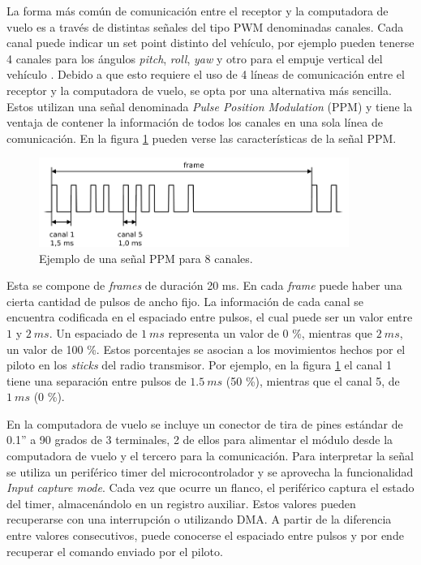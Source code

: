 La forma más común de comunicación entre el receptor y la computadora de vuelo es 
a través de distintas señales del tipo PWM denominadas canales. Cada canal puede indicar un set point distinto del vehículo, por ejemplo pueden tenerse 4 canales para los ángulos \textit{pitch}, \textit{roll}, \textit{yaw} y otro para el empuje vertical del vehículo \cite{garberoglio2019diseno}. Debido a que esto requiere el uso de 4 líneas de comunicación entre el receptor y la computadora de vuelo, se opta por una alternativa más sencilla. %
Estos utilizan una señal denominada \textit{Pulse Position Modulation} (PPM) y tiene la ventaja de contener la información de todos los canales en una sola línea de comunicación. En la figura \ref{fig:senial_ppm} pueden verse las características de la señal PPM.

\begin{figure}[htb]
    \centering
    \includegraphics[width=0.9\textwidth]{img/senial_ppm_mia.png}
    \caption{Ejemplo de una señal PPM para 8 canales.}
    \label{fig:senial_ppm}
\end{figure}

Esta se compone de \textit{frames} de duración 20 ms. En cada \textit{frame} puede haber una cierta cantidad de pulsos de ancho fijo. La información de cada canal se encuentra codificada en el espaciado entre pulsos, el cual puede ser un valor entre $1$ y $2 \ ms$. Un espaciado de $1 \ ms$ representa un valor de 0 \%, mientras que $2 \ ms$, un valor de 100 \%. Estos porcentajes se asocian a los movimientos hechos por el piloto en los \textit{sticks} del radio transmisor. Por ejemplo, en la figura \ref{fig:senial_ppm} el canal 1 tiene una separación entre pulsos de $1.5 \ ms$ (50 \%), mientras que el canal 5, de $1 \ ms$ (0 \%).

En la computadora de vuelo se incluye un conector de tira de pines
estándar de 0.1” a 90 grados de 3 terminales, 2 de ellos para alimentar el módulo desde la computadora de vuelo y el tercero para la comunicación. Para interpretar la señal se utiliza un periférico timer del microcontrolador y se aprovecha la funcionalidad \textit{Input capture mode}. Cada vez que ocurre un flanco, el periférico captura el estado del timer, almacenándolo en un registro auxiliar. Estos valores pueden recuperarse con una interrupción o utilizando DMA. A partir de la diferencia entre valores consecutivos, puede conocerse el espaciado entre pulsos y por ende recuperar el comando enviado por el piloto.

